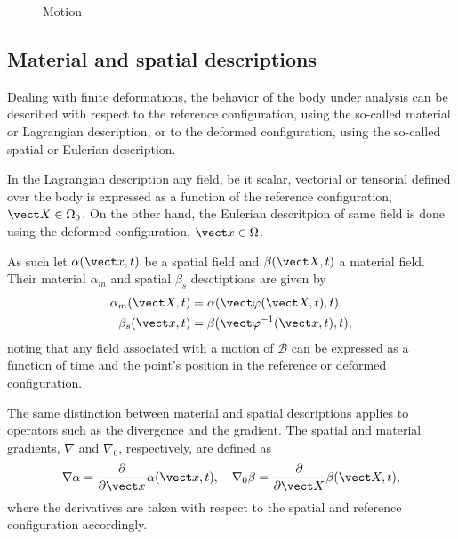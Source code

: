 \begin{figure}
  \centering
  \caption{Motion}
\label{fig:motion}
\end{figure}

\subsection{Material and spatial descriptions}

Dealing with finite deformations, the behavior of the body under analysis can be described with respect to the reference configuration, using the so-called material or Lagrangian description, or to the deformed configuration, using the so-called spatial or Eulerian description.

In the Lagrangian description any field, be it scalar, vectorial or tensorial defined over the body is expressed as a function of the reference configuration, $\vect X \in \Omega_0$.
On the other hand, the Eulerian descritpion of same field is done using the deformed configuration, $\vect x\in \Omega$.

As such let $\alpha(\vect x,t)$ be a spatial field and $\beta(\vect X, t)$ a material field.
Their material $\alpha_m$ and spatial $\beta_s$ desctiptions are given by
\begin{align}
    \alpha_m(\vect X, t) &=\alpha(\vect \varphi(\vect X, t),t),\\
    \beta_s(\vect x, t) &= \beta(\vect \varphi^{-1}(\vect x, t),t),
\end{align}
noting that any field associated with a motion of $\mathscr{B}$ can be expressed as a function of time and the point's position in the reference or deformed configuration.

The same distinction between material and spatial descriptions applies to operators such as the divergence and the gradient.
The spatial and material gradients, $\nabla$ and $\nabla_0$, respectively, are defined as
\begin{equation}
    \nabla \alpha = \frac{\partial}{\partial \vect x}\alpha(\vect x,t),\quad
    \nabla_0 \beta = \frac{\partial}{\partial \vect X}\beta (\vect X, t),
\end{equation}
where the derivatives are taken with respect to the spatial and reference configuration accordingly.

